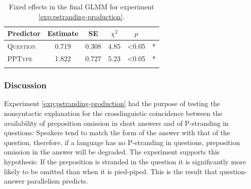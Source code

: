 \begin{table}
\begin{tabular}{l c c c c c}
\lsptoprule
Predictor & Estimate & SE & $\chi^2$ &  $p$ &  \\   
\midrule
\textsc{Question} & 0.719 &  0.308 & 4.85 & \textless 0.05 & * \\
\textsc{PPType} & 1.822 &     0.727 &   5.23 &  \textless 0.05 & *\\
\lspbottomrule
\end{tabular}
\caption{Fixed effects in the final GLMM for experiment \ref{exp:pstranding-production}.\label{tab:pstranding-production-estimates}}
\end{table}

\subsubsection{Discussion}
Experiment \ref{exp:pstranding-production} had the purpose of testing the nonsyntactic explanation for the crosslinguistic coincidence between the availability of preposition omission in short answers and of P-stranding in questions: Speakers tend to match the form of the answer with that of the question, therefore, if a language has no P-strand\-ing in questions, preposition omission in the answer will be degraded. The experiment supports this hypothesis: If the preposition is stranded in the question it is significantly more likely to be omitted than when it is pied-piped. This is the result that question-answer parallelism predicts.

